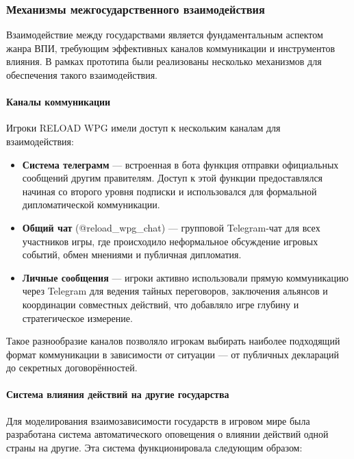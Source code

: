 \subsubsection{Механизмы межгосударственного взаимодействия}

Взаимодействие между государствами является фундаментальным аспектом жанра ВПИ, требующим эффективных каналов коммуникации и инструментов влияния. В рамках прототипа были реализованы несколько механизмов для обеспечения такого взаимодействия.

\paragraph{Каналы коммуникации}

Игроки RELOAD WPG имели доступ к нескольким каналам для взаимодействия:

\begin{itemize}
    \item \textbf{Система телеграмм} — встроенная в бота функция отправки официальных сообщений другим правителям. Доступ к этой функции предоставлялся начиная со второго уровня подписки и использовался для формальной дипломатической коммуникации.

    \item \textbf{Общий чат} (@reload\_wpg\_chat) — групповой Telegram-чат для всех участников игры, где происходило неформальное обсуждение игровых событий, обмен мнениями и публичная дипломатия.

    \item \textbf{Личные сообщения} — игроки активно использовали прямую коммуникацию через Telegram для ведения тайных переговоров, заключения альянсов и координации совместных действий, что добавляло игре глубину и стратегическое измерение.
\end{itemize}

Такое разнообразие каналов позволяло игрокам выбирать наиболее подходящий формат коммуникации в зависимости от ситуации — от публичных деклараций до секретных договорённостей.

\paragraph{Система влияния действий на другие государства}

Для моделирования взаимозависимости государств в игровом мире была разработана система автоматического оповещения о влиянии действий одной страны на другие. Эта система функционировала следующим образом:

